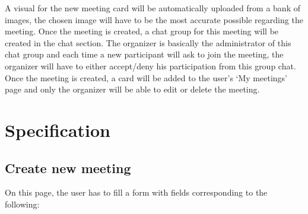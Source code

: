 \documentclass[conference]{IEEEtran}
\begin{document}
A visual for the new meeting card will be automatically uploaded from a bank of images, the chosen image will have to be the most accurate possible regarding the meeting.
Once the meeting is created, a chat group for this meeting will be created in the chat section. The organizer is basically the administrator of this chat group and each time a new participant will ask to join the meeting, the organizer will
have to either accept/deny his participation from this group chat.
Once the meeting is created, a card will be added to the user’s ‘My meetings’ page and only the organizer will be able to edit or delete the meeting.

\section{Specification}

\subsection{Create new meeting}

On this page, the user has to fill a form with fields corresponding to the following:
\end{document}

